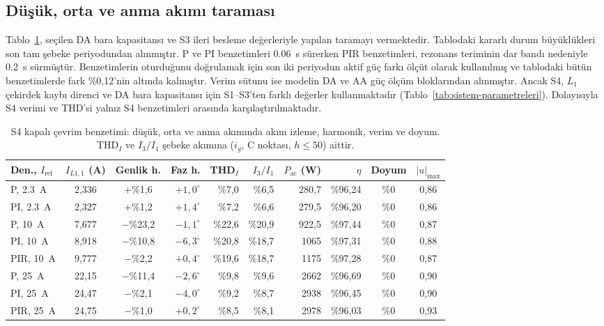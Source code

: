 \subsection{Düşük, orta ve anma akımı taraması}

Tablo~\ref{tab:s4-tarama}, seçilen DA bara kapasitansı ve S3 ileri besleme değerleriyle yapılan taramayı vermektedir. Tablodaki kararlı durum büyüklükleri son tam şebeke periyodundan alınmıştır. P ve PI benzetimleri \SI{0.06}{\second} sürerken PIR benzetimleri, rezonans teriminin dar bandı nedeniyle \SI{0.2}{\second} sürmüştür. Benzetimlerin oturduğunu doğrulamak için son iki periyodun aktif güç farkı ölçüt olarak kullanılmış ve tablodaki bütün benzetimlerde fark \%0,12'nin altında kalmıştır. Verim sütunu ise modelin DA ve AA güç ölçüm bloklarından alınmıştır. Ancak S4, $L_1$ çekirdek kaybı direnci ve DA bara kapasitansı için S1--S3'ten farklı değerler kullanmaktadır (Tablo~\ref{tab:sistem-parametreleri}). Dolayısıyla S4 verimi ve THD'si yalnız S4 benzetimleri arasında karşılaştırılmaktadır.

\begin{table}[H]
  \centering
  \caption{S4 kapalı çevrim benzetimi: düşük, orta ve anma akımında akım izleme, harmonik, verim ve doyum. THD$_I$ ve $I_3/I_1$ şebeke akımına ($i_g$, C noktası, $h\leq50$) aittir.}
  \label{tab:s4-tarama}
  \footnotesize
  \setlength{\tabcolsep}{2.6pt}
  \begin{tabular}{@{}l c c r r r r r c c@{}}
    \toprule
    Den., $I_{\mathrm{ref}}$ & $I_{L1,1}$ (A) & Genlik h. & Faz h. & THD$_I$ & $I_3/I_1$ & $P_{\mathrm{ac}}$ (W) & $\eta$ & Doyum & $|u|_{\max}$ \\
    \midrule
    P, \SI{2.3}{\ampere}   & 2,336 & $+$\%1,6  & $+1{,}0^{\circ}$ & \%7,0  & \%6,5  & 280,7 & \%96,24 & \%0 & 0,86 \\
    PI, \SI{2.3}{\ampere}  & 2,327 & $+$\%1,2  & $+1{,}4^{\circ}$ & \%7,2  & \%6,6  & 279,5 & \%96,20 & \%0 & 0,86 \\
    \midrule
    P, \SI{10}{\ampere}    & 7,677 & $-$\%23,2 & $-1{,}1^{\circ}$ & \%22,6 & \%20,9 & 922,5 & \%97,44 & \%0 & 0,87 \\
    PI, \SI{10}{\ampere}   & 8,918 & $-$\%10,8 & $-6{,}3^{\circ}$ & \%20,8 & \%18,7 & 1065  & \%97,31 & \%0 & 0,88 \\
    PIR, \SI{10}{\ampere}  & 9,777 & $-$\%2,2  & $+0{,}4^{\circ}$ & \%19,6 & \%18,7 & 1175  & \%97,28 & \%0 & 0,87 \\
    \midrule
    P, \SI{25}{\ampere}    & 22,15 & $-$\%11,4 & $-2{,}6^{\circ}$ & \%9,8  & \%9,6  & 2662  & \%96,69 & \%0 & 0,90 \\
    PI, \SI{25}{\ampere}   & 24,47 & $-$\%2,1  & $-4{,}0^{\circ}$ & \%9,2  & \%8,7  & 2938  & \%96,45 & \%0 & 0,90 \\
    PIR, \SI{25}{\ampere}  & 24,75 & $-$\%1,0  & $+0{,}2^{\circ}$ & \%8,5  & \%8,1  & 2978  & \%96,03 & \%0 & 0,93 \\
    \bottomrule
  \end{tabular}
\end{table}

